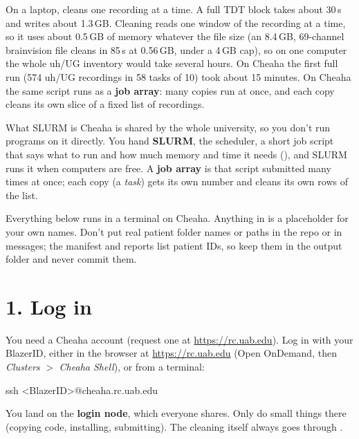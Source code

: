 
\renewcommand{\footname}{clean\_dbs \textperiodcentered\ Cheaha Guide}



On a laptop,  cleans one recording at a time. A full TDT block takes about 30\,s and writes about 1.3\,GB. Cleaning reads one window of the recording at a time, so it uses about 0.5\,GB of memory whatever the file size (an 8.4\,GB, 69-channel brainvision file cleans in 85\,s at 0.56\,GB, under a 4\,GB cap), so on one computer the whole uh/UG inventory would take several hours. On Cheaha the first full run (574 uh/UG recordings in 58 tasks of 10) took about 15 minutes. On Cheaha the same script runs as a \textbf{job array}: many copies run at once, and each copy cleans its own slice of a fixed list of recordings.

\begin{tip}{What SLURM is}
Cheaha is shared by the whole university, so you don't run programs on it directly. You hand \textbf{SLURM}, the scheduler, a short job script that says what to run and how much memory and time it needs (), and SLURM runs it when computers are free. A \textbf{job array} is that script submitted many times at once; each copy (a \textit{task}) gets its own number and cleans its own rows of the list.
\end{tip}

Everything below runs in a terminal on Cheaha. Anything in  is a placeholder for your own names. Don't put real patient folder names or paths in the repo or in messages; the manifest and reports list patient IDs, so keep them in the output folder and never commit them.

\section{1. Log in}
You need a Cheaha account (request one at \url{https://rc.uab.edu}). Log in with your BlazerID, either in the browser at \url{https://rc.uab.edu} (Open OnDemand, then \textit{Clusters} $>$ \textit{Cheaha Shell}), or from a terminal:
\begin{codebox}
ssh <BlazerID>@cheaha.rc.uab.edu
\end{codebox}
You land on the \textbf{login node}, which everyone shares. Only do small things there (copying code, installing, submitting). The cleaning itself always goes through .

